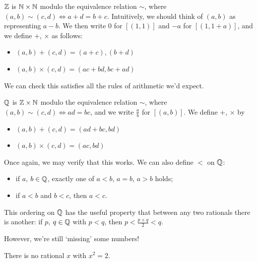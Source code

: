 \documentclass{../template/note}
\begin{document}
    \begin{definition}
        \(\mathbb Z\) is \(\mathbb N \times \mathbb N\) modulo the equivalence relation \(\sim\), where \((a, b) \sim (c, d) \iff a + d = b + c\). Intuitively, we should think of \((a, b)\) as representing \(a - b\). We then write 0 for \([(1, 1)]\) and \(-a\) for \([(1, 1 + a)]\), and we define \(+\), \(\times\) as follows:
        \begin{itemize}
            \item \((a, b) + (c, d) = (a + c), (b + d)\)
            \item \((a, b) \times (c, d) = (ac + bd, bc + ad)\)
        \end{itemize}
        We can check this satisfies all the rules of arithmetic we'd expect.
    \end{definition}

    \begin{definition}
        \(\mathbb Q\) is \(\mathbb Z \times \mathbb N\) modulo the equivalence relation \(\sim\), where \((a, b) \sim (c, d) \iff ad = bc\), and we write \(\frac{a}{b}\) for \([(a, b)]\). We define \(+\), \(\times\) by
        \begin{itemize}
            \item \((a, b) + (c, d) = (ad + bc, bd)\)
            \item \((a, b) \times (c, d) = (ac, bd)\)
        \end{itemize}
        Once again, we may verify that this works. We can also define \(<\) on \(\mathbb Q\):
        \begin{itemize}
            \item if \(a\), \(b \in \mathbb Q\), exactly one of \(a < b\), \(a = b\), \(a > b\) holds;
            \item if \(a < b\) and \(b < c\), then \(a < c\).
        \end{itemize}
        
                
    \end{definition}
    
    
    
    


    This ordering on \(\mathbb Q\) has the useful property that between any two rationals there is another: if \(p\), \(q \in \mathbb Q\) with \(p < q\), then \(p < \frac{p+q}{2} < q\).

    However, we're still `missing' some numbers!

    \begin{proposition}
        There is no rational \(x\) with \(x^2 = 2\).
    \end{proposition}
    
\end{document}
